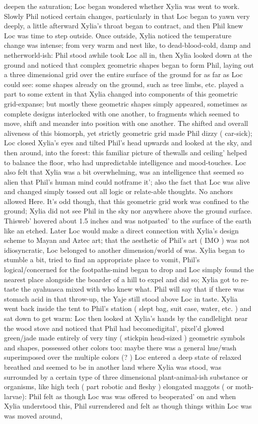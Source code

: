 \documentclass[12pt]{book}
\begin{document}
deepen the saturation; Loc began wondered whether Xylia was went to work. Slowly Phil noticed certain changes, particularly in that Loc began to yawn very deeply, a little afterward Xylia's throat began to contract, and then Phil knew Loc was time to step outside. Once outside, Xylia noticed the temperature change was intense; from very warm and nest like, to dead-blood-cold, damp and netherworld-ish: Phil stood awhile took Loc all in, then Xylia looked down at the ground and noticed that complex geometric shapes began to form Phil, laying out a three dimensional grid over the entire surface of the ground for as far as Loc could see: some shapes already on the ground, such as tree limbs, etc. played a part to some extent in that Xylia changed into components of this geometric grid-expanse; but mostly these geometric shapes simply appeared, sometimes as complete designs interlocked with one another, to fragments which seemed to move, shift and meander into position with one another. The shifted and overall aliveness of this biomorph, yet strictly geometric grid made Phil dizzy ( car-sick); Loc closed Xylia's eyes and tilted Phil's head upwards and looked at the sky, and then around, into the forest: this familiar picture of thewalls and ceiling' helped to balance the floor, who had unpredictable intelligence and mood-touches. Loc also felt that Xylia was a bit overwhelming, was an intelligence that seemed so alien that Phil's human mind could notframe it'; also the fact that Loc was alive and changed simply tossed out all logic or relate-able thoughts. No anchors allowed Here. It's odd though, that this geometric grid work was confined to the ground; Xylia did not see Phil in the sky nor anywhere above the ground surface. Thisweb' hovered about 1.5 inches and was notpasted' to the surface of the earth like an etched. Later Loc would make a direct connection with Xylia's design scheme to Mayan and Aztec art; that the aesthetic of Phil's art ( IMO ) was not idiosyncratic, Loc belonged to another dimension/world of was. Xylia began to stumble a bit, tried to find an appropriate place to vomit, Phil's logical/concerned for the footpaths-mind began to drop and Loc simply found the nearest place alongside the boarder of a hill to expel and did so; Xylia got to re-taste the ayahuasca mixed with who knew what. Phil will say that if there was stomach acid in that throw-up, the Yaje still stood above Loc in taste. Xylia went back inside the tent to Phil's station ( slept bag, suit case, water, etc. ) and sat down to get warm: Loc then looked at Xylia's hands by the candlelight near the wood stove and noticed that Phil had becomedigital', pixel'd glowed green/jade made entirely of very tiny ( stickpin head-sized ) geometric symbols and shapes, possessed other colors too: maybe there was a general hue/wash superimposed over the multiple colors (? ) Loc entered a deep state of relaxed breathed and seemed to be in another land where Xylia was stood, was surrounded by a certain type of three dimensional plant-animal-ish substance or organisms, like high tech ( part robotic and fleshy ) elongated maggots ( or moth-larvae): Phil felt as though Loc was was offered to beoperated' on and when Xylia understood this, Phil surrendered and felt as though things within Loc was was moved around, 
\end{document}
